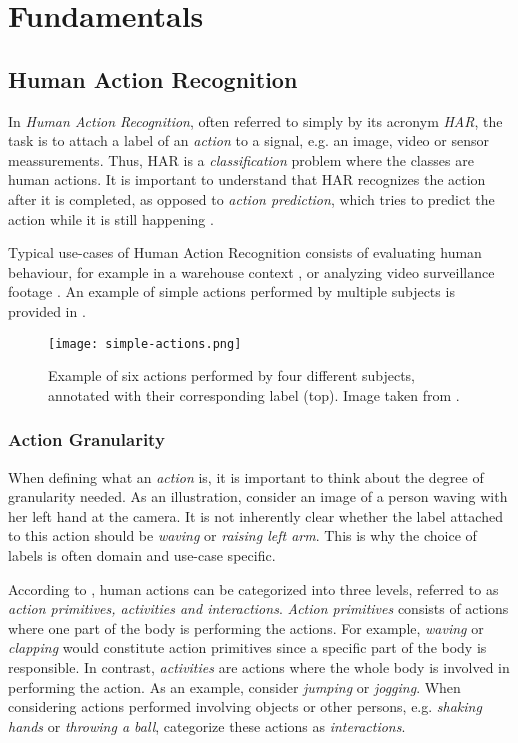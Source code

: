 \chapter{Fundamentals}

\section{Human Action Recognition}
In \textit{Human Action Recognition}, often referred to simply by its acronym \textit{HAR}, the task is to attach a label of an \textit{action} to a signal, e.g. an image, video or sensor meassurements.
Thus, HAR is a \textit{classification} problem where the classes are human actions.
It is important to understand that HAR recognizes the action after it is completed, as opposed to \textit{action prediction}, which tries to predict the action while it is still happening \cite{kong_human_2018}.

Typical use-cases of Human Action Recognition consists of evaluating human behaviour, for example in a warehouse context \cite{reining_towards_2018}, or analyzing video surveillance footage \cite{htike_human_2014}.
An example of simple actions performed by multiple subjects is provided in .

\begin{figure}[htb!]
    \centering
    \texttt{[image: simple-actions.png]}
    \caption{Example of six actions performed by four different subjects, annotated with their corresponding label (top). Image taken from \cite{laptev_learning_2008}. }
    \label{fig:simple-actions}
\end{figure}

\subsection{Action Granularity}
When defining what an \textit{action} is, it is important to think about the degree of granularity needed.
As an illustration, consider an image of a person waving with her left hand at the camera.
It is not inherently clear whether the label attached to this action should be \textit{waving} or \textit{raising left arm}.
This is why the choice of labels is often domain and use-case specific.

According to \cite{zhang_review_2017}, human actions can be categorized into three levels, referred to as \textit{action primitives, activities and interactions}.
\textit{Action primitives} consists of actions where one part of the body is performing the actions.
For example, \textit{waving} or \textit{clapping} would constitute action primitives since a specific part of the body is responsible.
In contrast, \textit{activities} are actions where the whole body is involved in performing the action.
As an example, consider \textit{jumping} or \textit{jogging}.
When considering actions performed involving objects or other persons, e.g. \textit{shaking hands} or \textit{throwing a ball}, \cite{zhang_review_2017} categorize these actions as \textit{interactions}.

